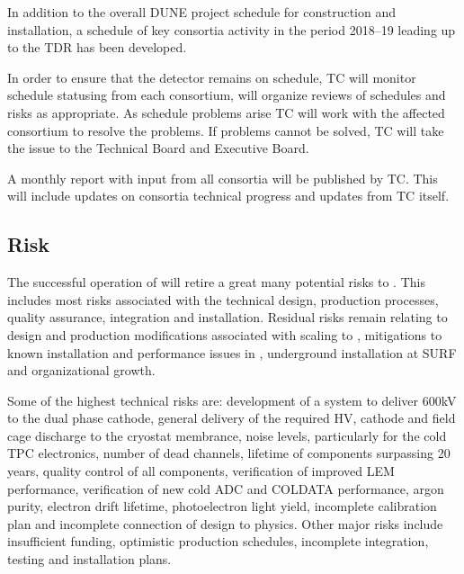 In addition to the overall DUNE project schedule for construction and
installation, a schedule of key consortia activity in the period
2018--19 leading up to the TDR has been developed.

In order to ensure that the  detector remains on schedule,
TC will monitor schedule statusing from each consortium, will organize
reviews of schedules and risks as appropriate.  As schedule problems
arise TC will work with the affected consortium to resolve the
problems. If problems cannot be solved, TC will take the issue to the
Technical Board and Executive Board.

A monthly report with input from all consortia will be published by
TC. This will include updates on consortia technical progress and
updates from TC itself.


\subsection{Risk}
\label{sec:fdsp-coord-risk}

The successful operation of  will retire a great many
potential risks to . This includes most risks associated with the
technical design, production processes, quality assurance, integration
and installation. Residual risks remain relating to design and
production modifications associated with scaling to , mitigations
to known installation and performance issues in , underground
installation at SURF and organizational growth.

Some of the highest technical risks are: development of a system to
deliver 600kV to the dual phase cathode, general delivery of the
required HV, cathode and field cage discharge to the cryostat
membrance, noise levels, particularly for the cold TPC electronics,
number of dead channels, lifetime of components surpassing 20 years,
quality control of all components, verification of improved LEM
performance, verification of new cold ADC and COLDATA performance,
argon purity, electron drift lifetime, photoelectron light yield,
incomplete calibration plan and incomplete connection of design to
physics. Other major risks include insufficient funding, optimistic
production schedules, incomplete integration, testing and installation
plans.

